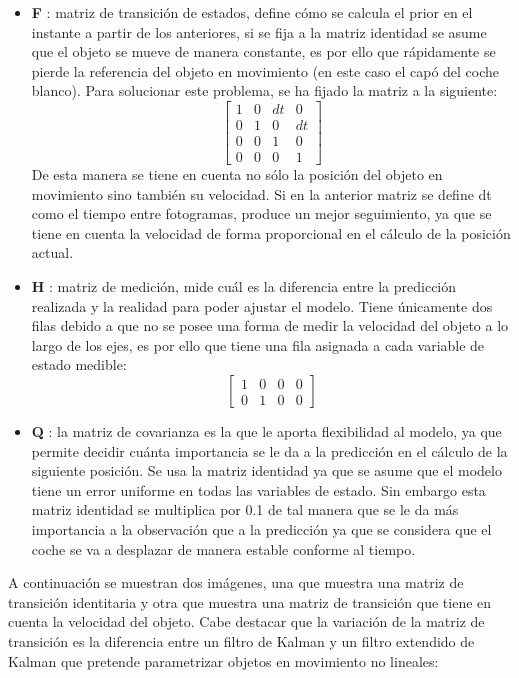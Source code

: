\documentclass[a4paper,12pt]{article}
\begin{document}
{\begin{itemize}
  \item \textbf{F} : matriz de transición de estados, define cómo se calcula el prior en el instante a partir de los anteriores, si se fija a la matriz identidad se asume que el objeto se mueve de manera constante, es por ello que 
  rápidamente se pierde la referencia del objeto en movimiento (en este caso el capó del coche blanco). Para solucionar este problema, se ha fijado la matriz a la siguiente:
  \[
  \begin{bmatrix}
    1 & 0 & dt & 0 \\
    0 & 1 & 0 & dt \\
    0 & 0 & 1 & 0 \\
    0 & 0 & 0 & 1
  \end{bmatrix}
  \]
  De esta manera se tiene en cuenta no sólo la posición del objeto en movimiento sino también su velocidad. Si en la anterior matriz se define dt como el tiempo entre fotogramas, produce un mejor seguimiento,
  ya que se tiene en cuenta la velocidad de forma proporcional en el cálculo de la posición actual.
  \item \textbf{H} : matriz de medición, mide cuál es la diferencia entre la predicción realizada y la realidad para poder ajustar el modelo. Tiene únicamente dos filas debido a que no se posee una forma
  de medir la velocidad del objeto a lo largo de los ejes, es por ello que tiene una fila asignada a cada variable de estado medible:
  \[
  \begin{bmatrix}
    1 & 0 & 0 & 0 \\
    0 & 1 & 0 & 0
  \end{bmatrix}
  \]
  \item \textbf{Q} : la matriz de covarianza es la que le aporta flexibilidad al modelo, ya que permite decidir cuánta importancia se le da a la predicción en el cálculo de la siguiente posición. Se
  usa la matriz identidad ya que se asume que el modelo tiene un error uniforme en todas las variables de estado. Sin embargo esta matriz identidad se multiplica por 0.1 de tal manera que se le da más
  importancia a la observación que a la predicción ya que se considera que el coche se va a desplazar de manera estable conforme al tiempo.
\end{itemize}

\vspace{0.5cm}

A continuación se muestran dos imágenes, una que muestra una matriz de transición identitaria y otra que muestra una matriz de transición que tiene en cuenta la velocidad del objeto. Cabe destacar
que la variación de la matriz de transición es la diferencia entre un filtro de Kalman y un filtro extendido de Kalman que pretende parametrizar objetos en movimiento no lineales:

}
\end{document}

